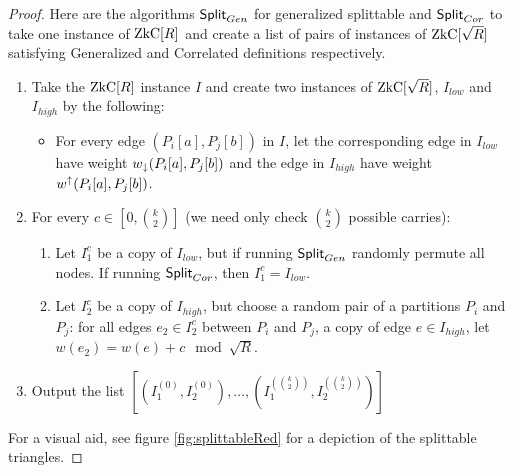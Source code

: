 \begin{proof}
	\newcommand{\lowI}{I_{low}}
	\newcommand{\highI}{I_{high}}
	Here are the algorithms $\mathsf{Split}_{Gen}$ for generalized splittable and $\mathsf{Split}_{Cor}$ to take one instance of $\ZkC[R]$ and create a list of pairs of instances of $\ZkC[\sqrt R]$ satisfying Generalized and Correlated definitions respectively.
	\begin{enumerate}
		\item Take the $\ZkC[R]$ instance $I$ and create two instances of $\ZkC[\sqrt R]$, $\lowI$ and $\highI$ by the following:
		\begin{itemize}
			\item For every edge $(P_i[a], P_j[b])$ in $I$, let the corresponding edge in $\lowI$ have weight ${w}_\downarrow(P_i[a], P_j[b])$ and the edge in $\highI$ have weight ${w}^\uparrow(P_i[a], P_j[b])$.
		\end{itemize}
		\item For every $c \in [0,\binom k 2]$ (we need only check $\binom k 2$ possible carries):%
		\begin{enumerate}
			\item Let $I_1^{c}$ be a copy of $\lowI$, but if running $\mathsf{Split}_{Gen}$ randomly permute all nodes. If running $\mathsf{Split}_{Cor}$, then $I_1^{c} = \lowI$.
			\item Let $I_2^{c}$ be a copy of $\highI$, but choose a random pair of a partitions $P_i$ and $P_j$: for all edges $e_2 \in I_2^{c}$ between $P_i$ and $P_j$, a copy of edge $e \in \highI$, let $w(e_2) = w(e) + c \mod \sqrt R$.
		\end{enumerate}
		\item Output the list $[(I_1^{(0)}, I_2^{(0)}), \ldots, (I_1^{(\binom k 2)}, I_2^{(\binom k 2)})]$
	\end{enumerate}
	For a visual aid, see figure \ref{fig:splittableRed} for a depiction of the splittable triangles. 


\end{proof}
